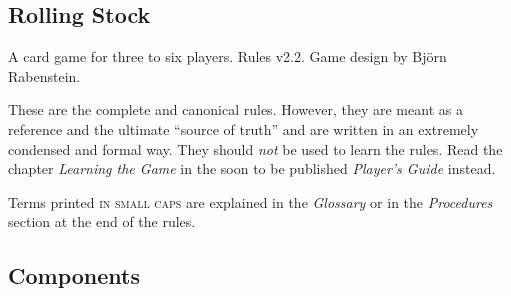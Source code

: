 \documentclass[11pt,a4paper]{article}
\begin{document}
\begin{center}
\section*{Rolling Stock}

A card game for three to six players. Rules v2.2. Game design by
Björn Rabenstein.
\end{center}

These are the complete and canonical rules. However, they are meant as
a reference and the ultimate ``source of truth'' and are written in an
extremely condensed and formal way. They should \emph{not} be used to
learn the rules. Read the chapter \emph{Learning the Game} in the soon
to be published \emph{Player's Guide} instead.

\begin{multicols}{2}

{
\small

  Terms printed \textsc{in small caps} are explained in the
  \emph{Glossary} or in the \emph{Procedures} section at the end of
  the rules.

\subsection*{Components}

}
\end{multicols}
\end{document}
